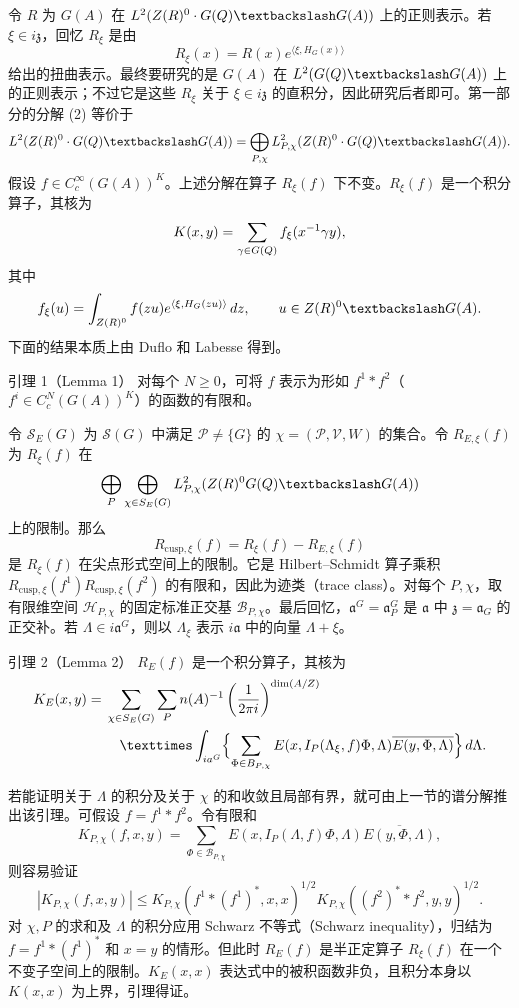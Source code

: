 令 $R$ 为 $G(A)$ 在 $L^2(Z(\R)^0\cdot G(\Q)\backslash G(A))$ 上的正则表示。若 $\xi\in i\mathfrak z$，回忆 $R_\xi$ 是由
\[
 R_\xi(x)=R(x)e^{\langle\xi,H_G(x)\rangle}
\]
给出的扭曲表示。最终要研究的是 $G(A)$ 在 $L^2(G(\Q)\backslash G(A))$ 上的正则表示；不过它是这些 $R_\xi$ 关于 $\xi\in i\mathfrak z$ 的直积分，因此研究后者即可。第一部分的分解 (2) 等价于
\[
 L^2(Z(\R)^0\cdot G(\Q)\backslash G(A))
 =\bigoplus_{\mathcal P,\chi}L_{\mathcal P,\chi}^2(Z(\R)^0\cdot G(\Q)\backslash G(A)).
\]
假设 $f\in C_c^\infty(G(A))^K$。上述分解在算子 $R_\xi(f)$ 下不变。$R_\xi(f)$ 是一个积分算子，其核为
\[
 K(x,y)=\sum_{\gamma\in G(Q)}f_\xi(x^{-1}\gamma y),
\]
其中
\[
 f_\xi(u)=\int_{Z(\R)^0}f(zu)e^{\langle\xi,H_G(zu)\rangle}\,dz,
 \qquad u\in Z(\R)^0\backslash G(A).
\]
下面的结果本质上由 Duflo 和 Labesse 得到。
\begin{originaltheorem}{引理 1（Lemma 1）}
对每个 $N\ge0$，可将 $f$ 表示为形如
$f^1*f^2$（$f^i\in C_c^N(G(A))^K$）的函数的有限和。
\end{originaltheorem}

令 $\mathcal S_E(G)$ 为 $\mathcal S(G)$ 中满足 $\mathcal P\ne\{G\}$ 的
$\chi=(\mathcal P,\mathcal V,W)$ 的集合。令 $R_{E,\xi}(f)$ 为 $R_\xi(f)$ 在
\[
 \bigoplus_\mathcal P\bigoplus_{\chi\in\mathcal S_E(G)}
 L_{\mathcal P,\chi}^2(Z(\R)^0G(\Q)\backslash G(A))
\]
上的限制。那么
\[
 R_{\mathrm{cusp},\xi}(f)=R_\xi(f)-R_{E,\xi}(f)
\]
是 $R_\xi(f)$ 在尖点形式空间上的限制。它是 Hilbert--Schmidt 算子乘积
$R_{\mathrm{cusp},\xi}(f^1)R_{\mathrm{cusp},\xi}(f^2)$ 的有限和，因此为迹类（trace class）。对每个 $P,\chi$，取有限维空间 $\mathcal H_{P,\chi}$ 的固定标准正交基 $\mathcal B_{P,\chi}$。最后回忆，$\mathfrak a^G=\mathfrak a_P^G$ 是
$\mathfrak a$ 中 $\mathfrak z=\mathfrak a_G$ 的正交补。若 $\Lambda\in i\mathfrak a^G$，则以 $\Lambda_\xi$ 表示 $i\mathfrak a$ 中的向量 $\Lambda+\xi$。

\begin{originaltheorem}{引理 2（Lemma 2）}
$R_E(f)$ 是一个积分算子，其核为
\[
\begin{split}
 K_E(x,y)={}&\sum_{\chi\in\mathcal S_E(G)}\sum_P n(A)^{-1}
 \left(\frac1{2\pi i}\right)^{\dim(A/Z)}\\
 &\quad\times\int_{i\mathfrak a^G}\Bigl\{\sum_{\Phi\in\mathcal B_{P,\chi}}
 E(x,I_P(\Lambda_\xi,f)\Phi,\Lambda)
 \overline{E(y,\Phi,\Lambda)}\Bigr\}\,d\Lambda.
\end{split}
\]
\end{originaltheorem}
若能证明关于 $\Lambda$ 的积分及关于 $\chi$ 的和收敛且局部有界，就可由上一节的谱分解推出该引理。可假设 $f=f^1*f^2$。令有限和
\[
 K_{P,\chi}(f,x,y)=\sum_{\Phi\in\mathcal B_{P,\chi}}
 E(x,I_P(\Lambda,f)\Phi,\Lambda)\overline{E(y,\Phi,\Lambda)},
\]
则容易验证
\[
 |K_{P,\chi}(f,x,y)|\le
 K_{P,\chi}(f^1*(f^1)^*,x,x)^{1/2}
 K_{P,\chi}((f^2)^**f^2,y,y)^{1/2}.
\]
对 $\chi,P$ 的求和及 $\Lambda$ 的积分应用 Schwarz 不等式（Schwarz inequality），归结为 $f=f^1*(f^1)^*$ 和 $x=y$ 的情形。但此时 $R_E(f)$ 是半正定算子 $R_\xi(f)$ 在一个不变子空间上的限制。$K_E(x,x)$ 表达式中的被积函数非负，且积分本身以 $K(x,x)$ 为上界，引理得证。

